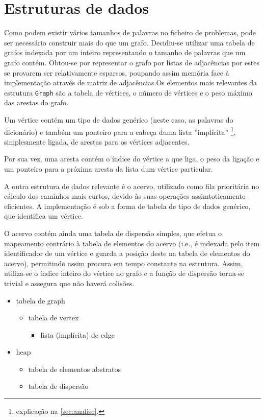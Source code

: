\documentclass[a4paper, 18pt]{article}
\begin{document}
\section{Estruturas de dados}
	\par
	Como podem existir vários tamanhos de palavras no ficheiro de problemas, pode ser necessário construir mais do que um grafo. Decidiu-se utilizar uma tabela de grafos indexada por um inteiro representando o tamanho de palavras que um grafo contém. Obtou-se por representar o grafo por listas de adjacências por estes se provarem ser relativamente esparsos, poupando assim memória face à implementação através de matriz de adjacências.Os elementos mais relevantes da estrutura \texttt{Graph} são a tabela de vértices, o número de vértices e o peso máximo das arestas do grafo.
	\par
	Um vértice contém um tipo de dados genérico (neste caso, as palavras do dicionário) e também um ponteiro para a cabeça duma lista ''implícita'' \footnote{explicação na \autoref{sec:analise}.}, simplesmente ligada, de arestas para os vértices adjacentes.
	\par
	Por sua vez, uma aresta contém o índice do vértice a que liga, o peso da ligação e um ponteiro para a próxima aresta da lista dum vértice particular.
	\par\null\par
	A outra estrutura de dados relevante é o acervo, utilizado como fila prioritária no cálculo dos caminhos mais curtos, devido às suas operações assimtoticamente eficientes. A implementação é sob a forma de tabela de tipo de dados genérico, que identifica um vértice.
	\par
	O acervo contém ainda uma tabela de dispersão simples, que efetua o mapeamento contrário à tabela de elementos do acervo (i.e., é indexada pelo item identificador de um vértice e guarda a posição deste na tabela de elementos do acervo), permitindo assim procura em tempo constante na estrutura. Assim, utiliza-se o índice inteiro do vértice no grafo e a função de dispersão torna-se trivial e assegura que não haverá colisões.

	\begin{itemize}
		\item tabela de graph
		\begin{itemize}
			\item tabela de vertex
			\begin{itemize}
				\item lista (implícita) de edge
			\end{itemize}
		\end{itemize}

		\item heap
		\begin{itemize}
			\item tabela de elementos abstratos
			\item tabela de dispersão
		\end{itemize}

	\end{itemize}
\end{document}
